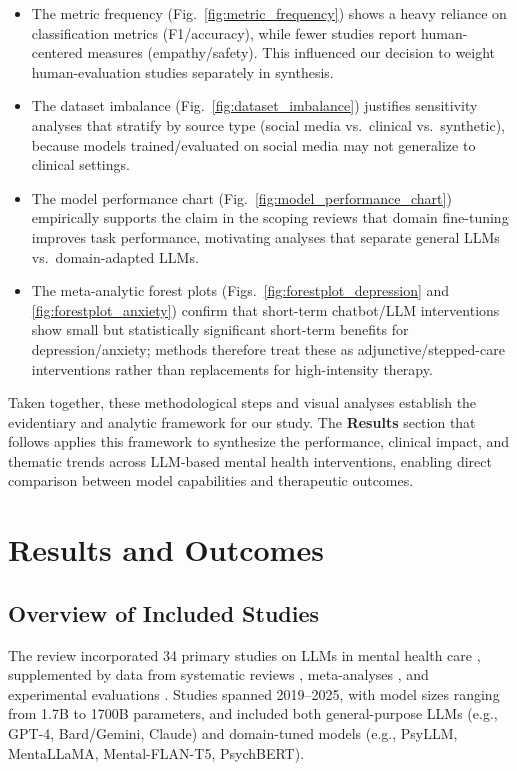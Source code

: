 \documentclass[journal]{IEEEtran}
\begin{document}
\begin{itemize}
    \item The metric frequency (Fig.~\ref{fig:metric_frequency}) shows a heavy reliance on classification metrics (F1/accuracy), while fewer studies report human-centered measures (empathy/safety). This influenced our decision to weight human-evaluation studies separately in synthesis.
    \item The dataset imbalance (Fig.~\ref{fig:dataset_imbalance}) justifies sensitivity analyses that stratify by source type (social media vs.\ clinical vs.\ synthetic), because models trained/evaluated on social media may not generalize to clinical settings.
    \item The model performance chart (Fig.~\ref{fig:model_performance_chart}) empirically supports the claim in the scoping reviews that domain fine-tuning improves task performance, motivating analyses that separate general LLMs vs.\ domain-adapted LLMs.
    \item The meta-analytic forest plots (Figs.~\ref{fig:forestplot_depression} and \ref{fig:forestplot_anxiety}) confirm that short-term chatbot/LLM interventions show small but statistically significant short-term benefits for depression/anxiety; methods therefore treat these as adjunctive/stepped-care interventions rather than replacements for high-intensity therapy.
\end{itemize}

Taken together, these methodological steps and visual analyses establish the evidentiary and analytic framework for our study. The \textbf{Results} section that follows applies this framework to synthesize the performance, clinical impact, and thematic trends across LLM-based mental health interventions, enabling direct comparison between model capabilities and therapeutic outcomes.

\section{Results and Outcomes}

\subsection{Overview of Included Studies}
The review incorporated 34 primary studies on LLMs in mental health care \citep{Hua2024b}, supplemented by data from systematic reviews \citep{JMIR2024}, meta-analyses \citep{Zhong2024}, and experimental evaluations \citep{Hodson2024, Hu2025}.
Studies spanned 2019--2025, with model sizes ranging from 1.7B to 1700B parameters, and included both general-purpose LLMs (e.g., GPT-4, Bard/Gemini, Claude) and domain-tuned models (e.g., PsyLLM, MentaLLaMA, Mental-FLAN-T5, PsychBERT).
\end{document}
